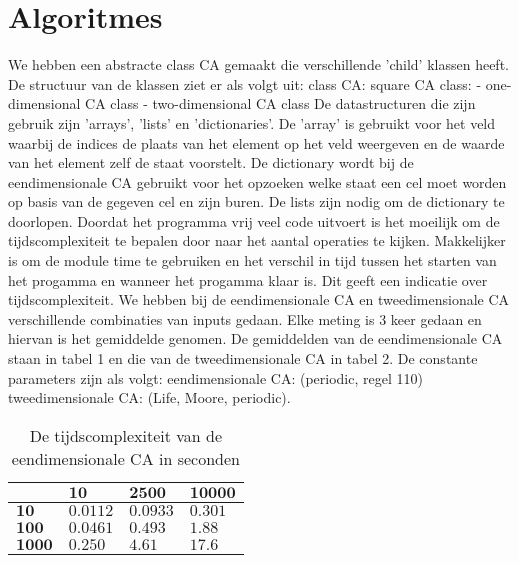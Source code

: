 \documentclass[12pt,a4paper]{article}
\begin{document}
\section*{Algoritmes}
We hebben een abstracte class CA gemaakt die verschillende 'child' klassen heeft.
\newline
De structuur van de klassen ziet er als volgt uit:
\newline
\phantom{.}class CA:
\newline
\phantom{.}\hspace{12pt}square CA class:
\newline
\phantom{.}\hspace{24pt}- one-dimensional CA class
\newline
\phantom{.}\hspace{24pt}- two-dimensional CA class
\vspace{6pt}
\newline
De datastructuren die zijn gebruik zijn 'arrays', 'lists' en 'dictionaries'. 
De 'array' is gebruikt voor het veld waarbij de indices de plaats van het element op het veld weergeven en 
de waarde van het element zelf de staat voorstelt.
De dictionary wordt bij de eendimensionale CA gebruikt voor het opzoeken welke staat een cel moet worden op basis van de gegeven cel en zijn buren.
De lists zijn nodig om de dictionary te doorlopen.
\newline
Doordat het programma vrij veel code uitvoert is het moeilijk om 
de tijdscomplexiteit te bepalen door naar het aantal operaties te kijken.
Makkelijker is om de module time te gebruiken en het verschil in tijd tussen het starten van het progamma en wanneer het progamma klaar is.
Dit geeft een indicatie over tijdscomplexiteit.  
We hebben bij de eendimensionale CA en tweedimensionale CA verschillende combinaties van
inputs gedaan. Elke meting is 3 keer gedaan en hiervan is het gemiddelde genomen.
De gemiddelden van de eendimensionale CA staan in tabel 1 en die 
van de tweedimensionale CA in tabel 2. De constante parameters zijn als volgt:
\newline
eendimensionale CA: (periodic, regel 110)
\newline
tweedimensionale CA: (Life, Moore, periodic).

\begin{table*}
    \centering
    \begin{tabular}{|m{1.2cm}|m{2.0cm}|m{2.0cm}|m{2.0cm}|}
        \hline
        $\phantom{.}$ & $\textbf{10}$ & $\textbf{2500}$ & $\textbf{10000}$ \\
        \hline
        $\textbf{10}$ & $0.0112$ & $0.0933$ & $0.301$ \\
        \hline
        $\textbf{100}$ & $0.0461$ & $0.493$ & $1.88$ \\
        \hline
        $\textbf{1000}$ & $0.250$ & $4.61$ & $17.6$ \\
        \hline
    \end{tabular}
    \caption{De tijdscomplexiteit van de eendimensionale CA in seconden}
    \label{tbl:1dim}
\end{table*}
\end{document}
